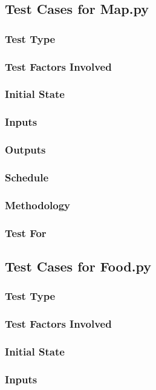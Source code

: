 \documentclass[12pt]{article}
\begin{document}
\subsection{Test Cases for Map.py}

\subsubsection*{Test Type}
\subsubsection*{Test Factors Involved}
\subsubsection*{Initial State}
\subsubsection*{Inputs}
\subsubsection*{Outputs}
\subsubsection*{Schedule}
\subsubsection*{Methodology}
\subsubsection*{Test For}


\subsection{Test Cases for Food.py}

\subsubsection*{Test Type}
\subsubsection*{Test Factors Involved}
\subsubsection*{Initial State}
\subsubsection*{Inputs}
\end{document}
